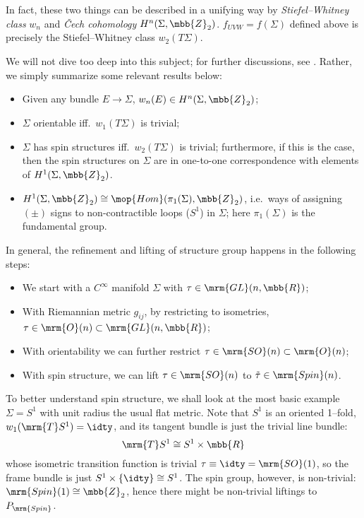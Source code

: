 \documentclass[a4paper,11pt]{article}
\begin{document}
	In fact, these two things can be described in a unifying way by \textit{Stiefel–Whitney class} $w_n$ and \textit{\v{C}ech cohomology} $H^n(\Sigma,\mbb{Z}_2)$. $f_{UVW} = f(\Sigma)$ defined above is precisely the  Stiefel–Whitney class $w_2(T\Sigma)$. 
\pagebreak[3]
	
	We will not dive too deep into this subject; for further discussions, see \cite{Nakahara:2003nw,lawson2016spin}. Rather, we simply summarize some relevant results below:
	\begin{itemize}[noitemsep,leftmargin=*]
	\item Given any bundle $E\to\Sigma$, $w_n(E)\in H^n(\Sigma,\mbb{Z}_2)$; 
	\item $\Sigma$ orientable iff.~$w_1(T\Sigma)$ is trivial; 
	\item $\Sigma$ has spin structures iff.~$w_2(T\Sigma)$ is trivial; furthermore, if this is the case, then the spin structures on $\Sigma$ are in one-to-one correspondence with elements of $H^1(\Sigma,\mbb{Z}_2)$. 
	\item $H^1(\Sigma,\mbb{Z}_2)\cong \mop{Hom}(\pi_1(\Sigma),\mbb{Z}_2)$, i.e.~ways of assigning $(\pm)$ signs to non-contractible loops ($S^1$) in $\Sigma$; here $\pi_1(\Sigma)$ is the fundamental group. 
	\end{itemize}
	In general, the refinement and lifting of structure group happens in the following steps:
	\begin{itemize}[noitemsep]
	\item We start with a $C^\infty$ manifold $\Sigma$ with $\tau\in\mrm{GL}(n,\mbb{R})$;
	\item With Riemannian metric $g_{ij}$, by restricting to isometries, $\tau\in\mrm{O}(n)\subset\mrm{GL}(n,\mbb{R})$;
	\item With orientability we can further restrict $\tau\in\mrm{SO}(n)\subset\mrm{O}(n)$;
	\item With spin structure, we can lift $\tau\in\mrm{SO}(n)$ to $\tilde{\tau}\in\mrm{Spin}(n)$. 
	\end{itemize}
	
	To better understand spin structure, we shall look at the most basic example $\Sigma = S^1$ with unit radius the usual flat metric. Note that $S^1$ is an oriented 1--fold, $w_1(\mrm{T}S^1) = \idty$, and its tangent bundle is just the trivial line bundle:
	\begin{equation}
		\mrm{T}S^1 \cong S^1\times \mbb{R}
		\label{eq:trivial_S1_bundle}
	\end{equation}
	whose isometric transition function is trivial $\tau\equiv\idty = \mrm{SO}(1)$, so the frame bundle is just $S^1\times\{\idty\}\cong S^1$. The spin group, however, is non-trivial: $\mrm{Spin}(1)\cong\mbb{Z}_2$, hence there might be non-trivial liftings to $P_{\mrm{Spin}}$. 
	
\end{document}
